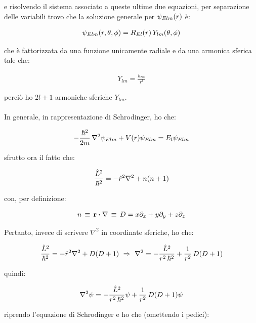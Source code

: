 	e risolvendo il sistema associato a queste ultime due equazioni, per separazione delle variabili trovo che la soluzione generale per $\psi_{Elm}\qty(r)$ è:
	
\begin{align*}
	\psi_{Elm}\qty(r, \theta, \phi) = R_{El} \qty(r) \, Y_{lm}\qty(\theta, \phi)
\end{align*}

	che è fattorizzata da una funzione unicamente radiale e da una armonica sferica tale che:
	
\begin{align*}
	Y_{lm} = \frac{h_{lm}}{r^l}
\end{align*}

	perciò ho $2l +1$ armoniche sferiche $Y_{lm}$.
	\\
	\\
	In generale, in rappresentazione di Schrodinger, ho che:
	
\begin{align*}
	- \frac{\hbar^2}{2m} \, \nabla^2\psi_{Elm} + V\qty(r)\psi_{Elm} = E_l \psi_{Elm}
\end{align*}

	sfrutto ora il fatto che:
	
\begin{align*}
	\frac{\hat{L}^2}{\hbar^2} = - \hat{r}^2 \nabla^2 + n\qty(n +1)
\end{align*}

	con, per definizione:
	
\begin{align*}
	n \, \equiv \, \vb{r} \vdot \nabla \, \equiv \, D = x \partial_x + y \partial_y + z \partial_z
\end{align*}

	Pertanto, invece di scrivere $\nabla^2$ in coordinate sferiche, ho che:
	
\begin{align*}
	\frac{\hat{L}^2}{\hbar^2} = -\hat{r}^2 \nabla^2 + D \qty(D + 1) \, \, \Rightarrow \, \, \nabla^2 = - \frac{\hat{L}^2}{r^2 \, \hbar^2} + \frac{1}{r^2} \, D \qty( D + 1)
\end{align*}

	quindi:
	
\begin{align*}
	\nabla^2 \psi = - \frac{\hat{L}^2}{r^2 \, \hbar^2}\psi + \frac{1}{r^2} \, D \qty(D + 1) \psi
\end{align*}

	riprendo l'equazione di Schrodinger e ho che (omettendo i pedici):
	
